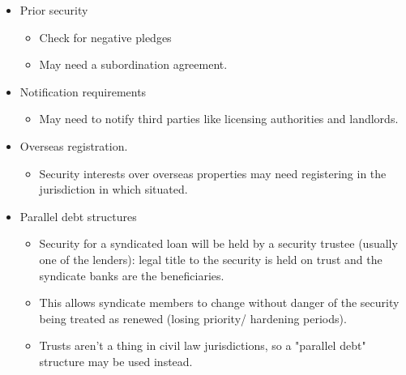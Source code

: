 \documentclass[
]{article}
\providecommand{\tightlist}{%
  \setlength{\itemsep}{0pt}\setlength{\parskip}{0pt}}
\begin{document}
\begin{itemize}
\tightlist
\item
  Prior security

  \begin{itemize}
  \tightlist
  \item
    Check for negative pledges
  \item
    May need a subordination agreement.
  \end{itemize}
\item
  Notification requirements

  \begin{itemize}
  \tightlist
  \item
    May need to notify third parties like licensing authorities and
    landlords.
  \end{itemize}
\item
  Overseas registration.

  \begin{itemize}
  \tightlist
  \item
    Security interests over overseas properties may need registering in
    the jurisdiction in which situated.
  \end{itemize}
\item
  Parallel debt structures

  \begin{itemize}
  \tightlist
  \item
    Security for a syndicated loan will be held by a security trustee
    (usually one of the lenders): legal title to the security is held on
    trust and the syndicate banks are the beneficiaries.
  \item
    This allows syndicate members to change without danger of the
    security being treated as renewed (losing priority/ hardening
    periods).
  \item
    Trusts aren't a thing in civil law jurisdictions, so a "parallel
    debt" structure may be used instead.


\end{itemize}
\end{itemize}
\end{document}
